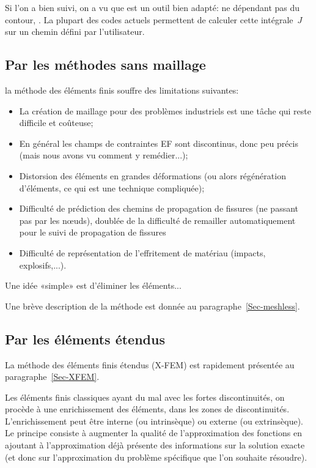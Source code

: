 \medskip
Si l'on a bien suivi, on a vu que  est un outil bien adapté: ne
dépendant pas du contour, .
La plupart des codes actuels permettent de calculer cette intégrale~$J$ sur un chemin
défini par l'utilisateur.



\medskip
\subsection{Par les méthodes sans maillage}

la méthode des éléments finis souffre des limitations suivantes:
\begin{itemize}
  \item La création de maillage pour des problèmes industriels est une tâche qui reste
	difficile et coûteuse;
  \item En général les champs de contraintes EF sont discontinus, donc peu précis (mais
	nous avons vu comment y remédier...);
  \item Distorsion des éléments en grandes déformations (ou alors régénération
	d'éléments, ce qui est une technique compliquée);
  \item Difficulté de prédiction des chemins de propagation de fissures (ne passant pas par
	les nœuds), doublée de la difficulté de remailler automatiquement pour le suivi de
	propagation de fissures
  \item Difficulté de représentation de l'effritement de matériau (impacts, explosifs,...).
\end{itemize}
Une idée «simple» est d'éliminer les éléments...

\medskip
Une brève description de la méthode est donnée au paragraphe~\ref{Sec-meshless}.


\medskip
\subsection{Par les éléments étendus}

La méthode des éléments finis étendus (X-FEM) est rapidement présentée au
paragraphe~\ref{Sec-XFEM}.

\medskip
Les éléments finis classiques ayant du mal avec les fortes discontinuités, on procède
à une enrichissement des éléments, dans les zones de discontinuités.
L'enrichissement peut être interne (ou intrinsèque) ou externe (ou extrinsèque).
Le principe consiste à augmenter la qualité de l'approximation des fonctions en ajoutant
à l'approximation déjà présente des informations sur la solution exacte (et donc sur
l'approximation du problème spécifique que l'on souhaite résoudre).



